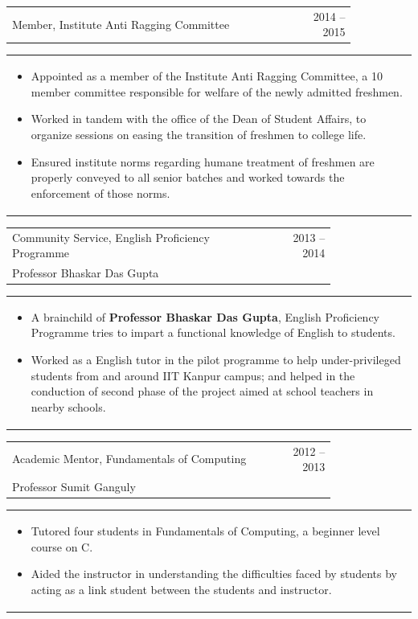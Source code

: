 \documentclass[a4paper,10pt]{article} %
\newcommand{\lproject}[4]{
    \begin{tabular}{p{0.80\linewidth}r}
        \textcolor{NavyBlue}{#2} & \multicolumn{1}{m{4cm}}{\raggedleft \textsc{#1}}\\
        #3
    \end{tabular}
    \begin{tabular}{p{\linewidth}}
    \vspace{-0.3cm}
        \footnotesize{#4}
    \end{tabular}
    \vspace{-0.5cm}
}
\newcommand{\iproject}[3]{
    \begin{tabular}{p{0.85\linewidth}r}
        \textcolor{NavyBlue}{#2} & \multicolumn{1}{m{3cm}}{\raggedleft \textsc{#1}}\\
    \end{tabular}
    \begin{tabular}{p{\linewidth}}
    \vspace{-0.3cm}
        \footnotesize{#3}
    \end{tabular}
    \vspace{-0.5cm}
}
\begin{document}
\iproject {2014 -- 2015}
          {Member, Institute Anti Ragging Committee}
          {
               \begin{itemize}[leftmargin=0.5cm]
                   \item Appointed as a member of the Institute Anti Ragging Committee, a 10 member committee responsible
                       for welfare of the newly admitted freshmen.
                   \item Worked in tandem with the office of the Dean of Student Affairs, to organize sessions
                       on easing the transition of freshmen to college life.
                   \item Ensured institute norms regarding humane treatment of freshmen are properly conveyed to all senior batches
                       and worked towards the enforcement of those norms.
               \end{itemize}
          }

\lproject {2013 -- 2014}
          {Community Service, English Proficiency Programme}
          {Professor Bhaskar Das Gupta}
          {
               \begin{itemize}[leftmargin=0.5cm]
                   \item A brainchild of \textbf{Professor Bhaskar Das Gupta}, English Proficiency Programme
                       tries to impart a functional knowledge of English to students.
                   \item Worked as a English tutor in the pilot programme to help under-privileged students from
                       and around IIT Kanpur campus; and helped in the conduction of second phase of the project
                       aimed at school teachers in nearby schools.
               \end{itemize}
          }

\lproject {2012 -- 2013}
          {Academic Mentor, Fundamentals of Computing}
          {Professor Sumit Ganguly}
          {
               \begin{itemize}[leftmargin=0.5cm]
                   \item Tutored four students in Fundamentals of Computing, a beginner level course on C.
                   \item Aided the instructor in understanding the difficulties faced by students by acting as a link
                       student between the students and instructor.
               \end{itemize}
          }
\end{document}
